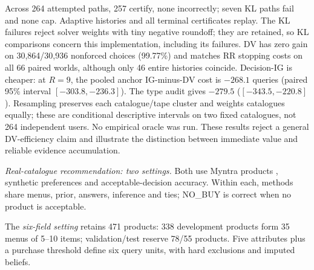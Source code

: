 \documentclass[sigconf,anonymous,review]{acmart}
\begin{document}
Across 264 attempted paths, 257 certify, none incorrectly; seven KL paths fail and none cap. Adaptive histories and all terminal certificates replay. The KL failures reject solver weights with tiny negative roundoff; they are retained, so KL comparisons concern this implementation, including its failures. DV has zero gain on 30,864/30,936 nonforced choices (99.77\%) and matches RR stopping costs on all 66 paired worlds, although only 46 entire histories coincide. Decision-IG is cheaper: at $R=9$, the pooled anchor IG-minus-DV cost is $-268.1$ queries (paired 95\% interval $[-303.8,-236.3]$). The type audit gives $-279.5$ ($[-343.5,-220.8]$). Resampling preserves each catalogue/tape cluster and weights catalogues equally; these are conditional descriptive intervals on two fixed catalogues, not 264 independent users. No empirical oracle was run. These results reject a general DV-efficiency claim and illustrate the distinction between immediate value and reliable evidence accumulation.
\par
\emph{Real-catalogue recommendation: two settings.} Both use Myntra products \cite{r6}, synthetic preferences and acceptable-decision accuracy. Within each, methods share menus, prior, answers, inference and ties; NO\_BUY is correct when no product is acceptable.

The \emph{six-field setting} retains 471 products: 338 development products form 35 menus of 5--10 items; validation/test reserve 78/55 products. Five attributes plus a purchase threshold define six query units, with hard exclusions and imputed beliefs.
\end{document}

